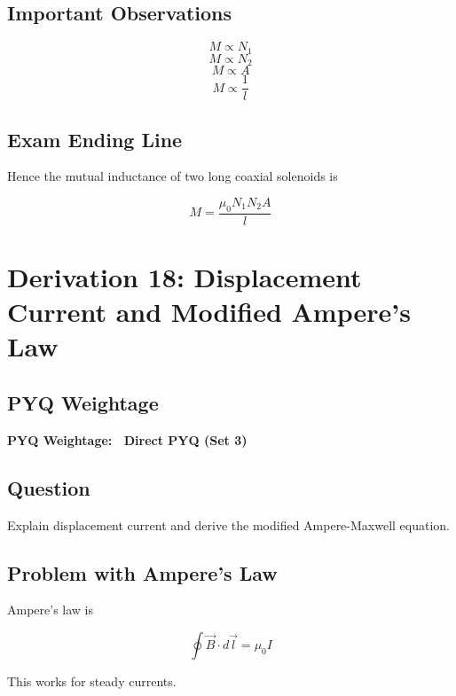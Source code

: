 \documentclass[11pt,a4paper]{article}
\begin{document}
\subsection*{Important Observations}
\[ M \propto N_1 \]
\[ M \propto N_2 \]
\[ M \propto A \]
\[ M \propto \frac{1}{l} \]

\subsection*{Exam Ending Line}
Hence the mutual inductance of two long coaxial solenoids is
\begin{tcolorbox}[colback=RoyalBlue!5!white, colframe=RoyalBlue]
    \[ M = \frac{\mu_0 N_1 N_2 A}{l} \]
\end{tcolorbox}

\newpage

\section{Derivation 18: Displacement Current and Modified Ampere's Law}

\subsection*{PYQ Weightage}
\begin{tcolorbox}[colback=yellow!10!white, colframe=orange, halign=center]
    \textbf{PYQ Weightage: \textasteriskcentered\textasteriskcentered\textasteriskcentered\textasteriskcentered\textasteriskcentered\ Direct PYQ (Set 3)}
\end{tcolorbox}

\subsection*{Question}
Explain displacement current and derive the modified Ampere-Maxwell equation.

\subsection*{Problem with Ampere's Law}
Ampere's law is
\begin{tcolorbox}[colback=RoyalBlue!5!white, colframe=RoyalBlue]
    \[ \oint \vec{B} \cdot d\vec{l} = \mu_0 I \]
\end{tcolorbox}
This works for steady currents.
\end{document}
